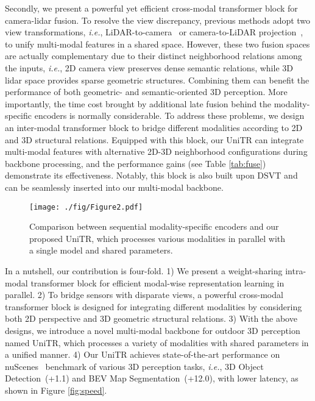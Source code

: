 \documentclass[10pt,twocolumn,letterpaper]{article}
\begin{document}
Secondly, we present a powerful yet efficient cross-modal transformer block for camera-lidar fusion. To resolve the view discrepancy, previous methods adopt two view transformations, \textit{i.e.}, LiDAR-to-camera~\cite{bai2022transfusion,yang2022boosting,chen2022futr3d,li2022deepfusion} or camera-to-LiDAR projection~\cite{liu2022bevfusion,liang2022bevfusion,philion2020lift}, to unify multi-modal features in a shared space. However, these two fusion spaces are actually complementary due to their distinct neighborhood relations among the inputs, \emph{i.e.}, 2D camera view preserves dense semantic relations, while 3D lidar space provides sparse geometric structures. Combining them can benefit the performance of both geometric- and semantic-oriented 3D perception. More importantly, the time cost brought by additional late fusion behind the modality-specific encoders is normally considerable. To address these problems, we design an inter-modal transformer block to bridge different modalities according to 2D and 3D structural relations. Equipped with this block, our UniTR can integrate multi-modal features with alternative 2D-3D neighborhood configurations during backbone processing, and the performance gains (see Table \ref{tab:fuse}) demonstrate its effectiveness. Notably, this block is also built upon DSVT and can be seamlessly inserted into our multi-modal backbone.

\begin{figure}[t]
\begin{center}
\texttt{[image: ./fig/Figure2.pdf]}
\end{center}
\vspace{-10pt}
   \caption{Comparison between sequential modality-specific encoders and our proposed UniTR, which processes various modalities in parallel with a single model and shared parameters.}
\label{fig:compare}
\vspace{-12pt}
\end{figure}

In a nutshell, our contribution is four-fold. 1) We present a weight-sharing intra-modal transformer block for efficient modal-wise representation learning in parallel.  2) To bridge sensors with disparate views, a powerful cross-modal transformer block is designed for integrating different modalities by considering both 2D perspective and 3D geometric structural relations.  3) With the above designs,  we introduce a novel multi-modal backbone for outdoor 3D perception named UniTR, which processes a variety of modalities with shared parameters in a unified manner. 4) Our UniTR achieves state-of-the-art performance on nuScenes~\cite{caesar2020nuscenes} benchmark of various 3D perception tasks, \emph{i.e.}, 3D Object Detection~(+1.1) and BEV Map Segmentation~(+12.0), with lower latency, as shown in Figure \ref{fig:speed}.
\end{document}
